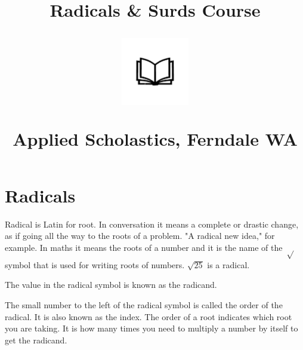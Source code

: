 \documentclass{article}
\author{}
\date{}
\title{\textbf{Radicals \& Surds Course}\\
\vspace{28pt}
\begin{center}
\includegraphics[width=4em]{ApS_logo.png}
\end{center}
\begin{normalsize}
Applied Scholastics, Ferndale WA
\end{normalsize}}
\begin{document}
\maketitle


\section*{Radicals}

Radical is Latin for root. In conversation it means a complete or drastic change, as if going all the way to the roots of a problem. "A radical new idea," for example. In maths it means the roots of a number and it is the name of the $\sqrt$ symbol that is used for writing roots of numbers. $\sqrt{25}$ is a radical.

The value in the radical symbol is known as the radicand.

The small number to the left of the radical symbol is called the order of the radical. It is also known as the index. The order of a root indicates which root you are taking. It is how many times you need to multiply a number by itself to get the radicand.
\end{document}
